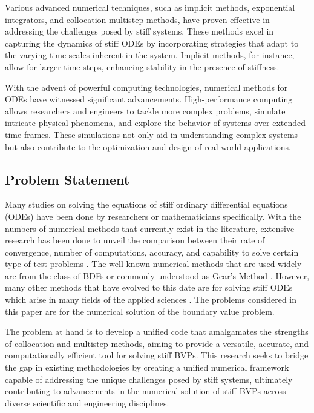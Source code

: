 \documentclass{report}
\begin{document}
Various advanced numerical techniques, such as implicit methods, exponential integrators, and collocation multistep methods, have proven effective in addressing the challenges posed by stiff systems. These methods excel in capturing the dynamics of stiff ODEs by incorporating strategies that adapt to the varying time scales inherent in the system. Implicit methods, for instance, allow for larger time steps, enhancing stability in the presence of stiffness.

With the advent of powerful computing technologies, numerical methods for ODEs have witnessed significant advancements. High-performance computing allows researchers and engineers to tackle more complex problems, simulate intricate physical phenomena, and explore the behavior of systems over extended time-frames. These simulations not only aid in understanding complex systems but also contribute to the optimization and design of real-world applications.

\subsection{Problem Statement}

Many studies on solving the equations of stiff ordinary differential equations (ODEs) have been done by researchers or mathematicians specifically. With the numbers of numerical methods that currently exist in the literature, extensive research has been done to unveil the comparison between their rate of convergence, number of computations, accuracy, and capability to solve certain type of test problems \cite{Enright1975} . The well-known numerical methods that are used widely are from the class of BDFs or commonly understood as Gear’s Method \cite{BYRNE1977125}. 
However, many other methods that have evolved to this date are for solving stiff ODEs which arise in many fields of the applied sciences \cite{Yatim2013}. The problems considered in this paper are for the numerical solution of the boundary value problem.

The problem at hand is to develop a unified code that amalgamates the strengths of collocation and multistep methods, aiming to provide a versatile, accurate, and computationally efficient tool for solving stiff BVPs. This research seeks to bridge the gap in existing methodologies by creating a unified numerical framework capable of addressing the unique challenges posed by stiff systems, ultimately contributing to advancements in the numerical solution of stiff BVPs across diverse scientific and engineering disciplines.
\end{document}
